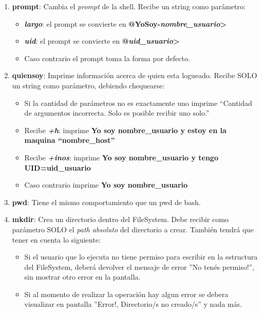\begin{enumerate}
\begin{enumerate}
\begin{enumerate}
		 \item \textbf{prompt}: Cambia el \textit{prompt} de la shell. Recibe un string como parámetro:
		 \begin{itemize}
		 	\item \textbf{\emph{largo}}: el prompt se convierte en \textbf{@YoSoy-\emph{nombre\_usuario}>}
		 	\item \textbf{\emph{uid}}: el prompt se convierte en \textbf{@\emph{uid\_usuario}>}
		 	\item Caso contrario el prompt toma la forma por defecto.
		 \end{itemize}
	     
		 \item \textbf{quiensoy}: Imprime información acerca de quien esta logueado. Recibe SOLO un string como parámetro, debiendo chequearse:
		 \begin{itemize}
		 	\item Si la cantidad de parámetros no es exactamente uno imprime ``Cantidad de argumentos incorrecta. Solo es posible recibir uno solo.''
		 	\item Recibe \textbf{\emph{+h}}: imprime \textbf{Yo soy nombre\_usuario y estoy en la maquina ``nombre\_host''}
		 	\item Recibe \textbf{\emph{+inos}}: imprime \textbf{Yo soy nombre\_usuario y tengo UID=uid\_usuario}
		 	\item Caso contrario imprime \textbf{Yo soy nombre\_usuario}
		 \end{itemize}

	     \item \textbf{pwd}: Tiene el mismo comportamiento que un pwd de bash.
	     
	     \item \textbf{mkdir}: Crea un directorio dentro del FileSystem. Debe recibir como parámetro SOLO el \textit{path absoluto} del directorio a crear. También tendrá que tener en cuenta lo siguiente:
	     \begin{itemize}
	     	\item Si el usuario que lo ejecuta no tiene permiso para escribir en la estructura del FileSystem, deberá devolver el mensaje de error ”No tenés permiso!”, sin mostrar otro error en la pantalla.
	     	\item Si al momento de realizar la operación hay algun error se debera visualizar en pantalla ”Error!, Directorio/s no creado/s” y nada más.
	     \end{itemize}	      
	    \end{enumerate}


\end{enumerate}
\end{enumerate}

